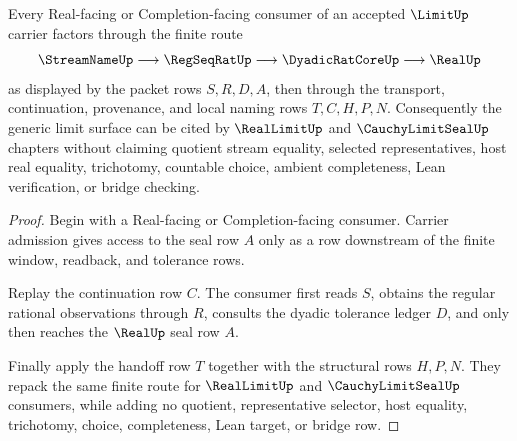 \begin{theorem}
\label{thm:limit-real-completion-handoff}
Every Real-facing or Completion-facing consumer of an accepted $\LimitUp$ carrier factors through the finite route
$$
\StreamNameUp \longrightarrow \RegSeqRatUp \longrightarrow \DyadicRatCoreUp \longrightarrow \RealUp
$$
as displayed by the packet rows $S,R,D,A$, then through the transport, continuation, provenance, and local naming rows $T,C,H,P,N$. Consequently the generic limit surface can be cited by $\RealLimitUp$ and $\CauchyLimitSealUp$ chapters without claiming quotient stream equality, selected representatives, host real equality, trichotomy, countable choice, ambient completeness, Lean verification, or bridge checking.
\end{theorem}
\begin{proof}
Begin with a Real-facing or Completion-facing consumer. Carrier admission gives access to the seal row $A$ only as a row downstream of the finite window, readback, and tolerance rows.

Replay the continuation row $C$. The consumer first reads $S$, obtains the regular rational observations through $R$, consults the dyadic tolerance ledger $D$, and only then reaches the $\RealUp$ seal row $A$.

Finally apply the handoff row $T$ together with the structural rows $H,P,N$. They repack the same finite route for $\RealLimitUp$ and $\CauchyLimitSealUp$ consumers, while adding no quotient, representative selector, host equality, trichotomy, choice, completeness, Lean target, or bridge row.
\end{proof}

